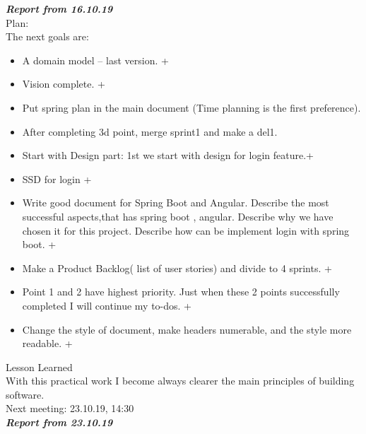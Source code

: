 \documentclass{scrartcl}
\begin{document}
\textbf{\textit{Report from 16.10.19}}\\
Plan:\\
The next goals are:\\
\begin{itemize}


	\item	A domain model – last version. +
	\item	Vision complete. +
	\item	Put spring plan in the main document (Time planning is the first preference).
	\item	After completing 3d point, merge sprint1 and make a del1.
	\item	Start with Design part: 1st we start with design for login feature.+
	\item	SSD for login +
	\item	Write good document for Spring Boot and Angular. Describe the most successful aspects,that has spring boot , angular. Describe why we have chosen it for this project. Describe how can be implement login with spring boot.    +
	\item	Make a Product Backlog( list of user stories) and divide to 4 sprints. +
	\item	Point 1 and 2 have highest priority. Just when these 2 points successfully completed I will continue my  to-dos.  +
	\item	Change the style of document, make headers numerable, and the style more readable.  +
 \end{itemize}
Lesson Learned\\
With this practical work I become always clearer the main principles of building software.\\

Next meeting:		23.10.19, 14:30\\



\textbf{\textit{Report from 23.10.19}}\\
\end{document}
